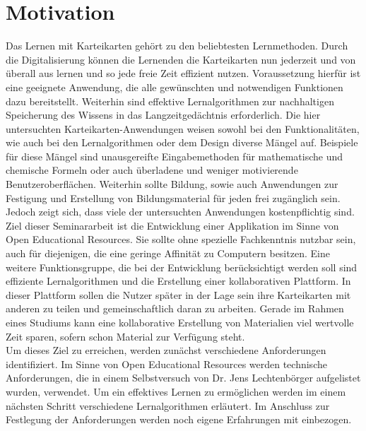 %
%

\section{Motivation}
Das Lernen mit Karteikarten gehört zu den beliebtesten Lernmethoden. Durch die Digitalisierung können die Lernenden die Karteikarten nun jederzeit und von überall aus lernen und so jede freie Zeit effizient nutzen. Voraussetzung hierfür ist eine geeignete Anwendung, die alle gewünschten und notwendigen Funktionen dazu bereitstellt. Weiterhin sind effektive Lernalgorithmen zur nachhaltigen Speicherung des Wissens in das Langzeitgedächtnis erforderlich. Die hier untersuchten Karteikarten-Anwendungen weisen sowohl bei den Funktionalitäten, wie auch bei den Lernalgorithmen oder dem Design diverse Mängel auf. Beispiele für diese Mängel sind unausgereifte Eingabemethoden für mathematische und chemische Formeln oder auch überladene und weniger motivierende Benutzeroberflächen. Weiterhin sollte Bildung, sowie auch Anwendungen zur Festigung und Erstellung von Bildungsmaterial für jeden frei zugänglich sein. Jedoch zeigt sich, dass viele der untersuchten Anwendungen kostenpflichtig sind.\\

Ziel dieser Seminararbeit ist die Entwicklung einer Applikation im Sinne von Open Educational Resources. Sie sollte ohne spezielle Fachkenntnis nutzbar sein, auch für diejenigen, die eine geringe Affinität zu Computern besitzen. Eine weitere Funktionsgruppe, die bei der Entwicklung berücksichtigt werden soll sind effiziente Lernalgorithmen und die Erstellung einer kollaborativen Plattform. In dieser Plattform sollen die Nutzer später in der Lage sein ihre Karteikarten mit anderen zu teilen und gemeinschaftlich daran zu arbeiten. Gerade im Rahmen eines Studiums kann eine kollaborative Erstellung von Materialien viel wertvolle Zeit sparen, sofern schon Material zur Verfügung steht. \\

Um dieses Ziel zu erreichen, werden zunächst verschiedene Anforderungen identifiziert. Im Sinne von Open Educational Resources werden technische Anforderungen, die in einem Selbstversuch von Dr. Jens Lechtenbörger aufgelistet wurden, verwendet. Um ein effektives Lernen zu ermöglichen werden im einem nächsten Schritt verschiedene Lernalgorithmen erläutert. Im Anschluss zur Festlegung der Anforderungen werden noch eigene Erfahrungen mit einbezogen.

